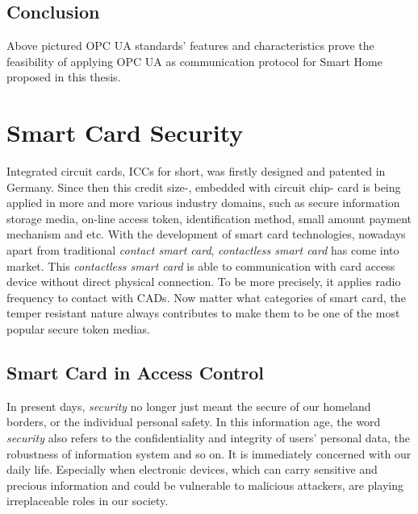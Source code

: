\subsection{Conclusion}
Above pictured OPC UA standards' features and characteristics prove the feasibility of applying OPC UA as communication protocol for Smart Home proposed in this thesis.

\section{Smart Card Security}
Integrated circuit cards, ICCs for short, was firstly designed and patented in Germany\cite{smart_card_history}. Since then this credit size-, embedded with circuit chip- card is being applied in more and more various industry domains, such as secure information storage media, on-line access token, identification method, small amount payment mechanism and etc. With the development of smart card technologies, nowadays apart from traditional \emph{contact smart card}, \emph{contactless smart card}\cite{smart_card_contactless} has come into market. This \emph{contactless smart card} is able to communication with card access device without direct physical connection. To be more precisely, it applies radio frequency to contact with CADs. Now matter what categories of smart card, the temper resistant nature always contributes to make them to be one of the most popular secure token medias.
\subsection{Smart Card in Access Control}
In present days, \emph{security} no longer just meant the secure of our homeland borders, or the individual personal safety. In this information age, the word \emph{security} also refers to the confidentiality and integrity of users' personal data, the robustness of information system and so on. It is immediately concerned with our daily life. Especially when electronic devices, which can carry sensitive and precious information and could be vulnerable to malicious attackers, are playing irreplaceable roles in our society. 

